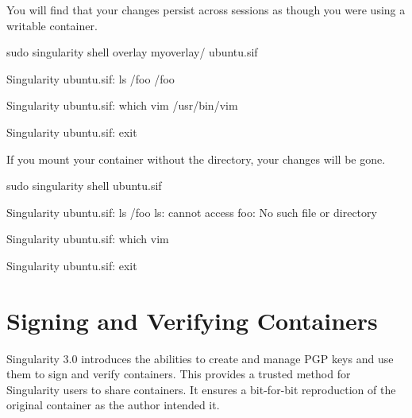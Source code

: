 \documentclass[letterpaper,10pt,english]{sphinxmanual}
\begin{document}
You will find that your changes persist across sessions as though you were using
a writable container.

%
\begin{sphinxVerbatim}[commandchars=\\\{\}]
\PYGZdl{} sudo singularity shell \PYGZhy{}\PYGZhy{}overlay my\PYGZus{}overlay/ ubuntu.sif

Singularity ubuntu.sif:\PYGZti{}\PYGZgt{} ls /foo
/foo

Singularity ubuntu.sif:\PYGZti{}\PYGZgt{} which vim
/usr/bin/vim

Singularity ubuntu.sif:\PYGZti{}\PYGZgt{} exit
\end{sphinxVerbatim}

If you mount your container without the  directory, your changes
will be gone.

%
\begin{sphinxVerbatim}[commandchars=\\\{\}]
\PYGZdl{} sudo singularity shell ubuntu.sif

Singularity ubuntu.sif:\PYGZti{}\PYGZgt{} ls /foo
ls: cannot access \PYGZsq{}foo\PYGZsq{}: No such file or directory

Singularity ubuntu.sif:\PYGZti{}\PYGZgt{} which vim

Singularity ubuntu.sif:\PYGZti{}\PYGZgt{} exit
\end{sphinxVerbatim}


\chapter{Signing and Verifying Containers}
\label{\detokenize{signNverify:signing-and-verifying-containers}}\label{\detokenize{signNverify:signnverify}}\label{\detokenize{signNverify::doc}}\label{\detokenize{signNverify:sec-signnverify}}
Singularity 3.0 introduces the abilities to create and manage PGP keys and use
them to sign and verify containers. This provides a trusted method for
Singularity users to share containers. It ensures a bit-for-bit reproduction
of the original container as the author intended it.
\end{document}
